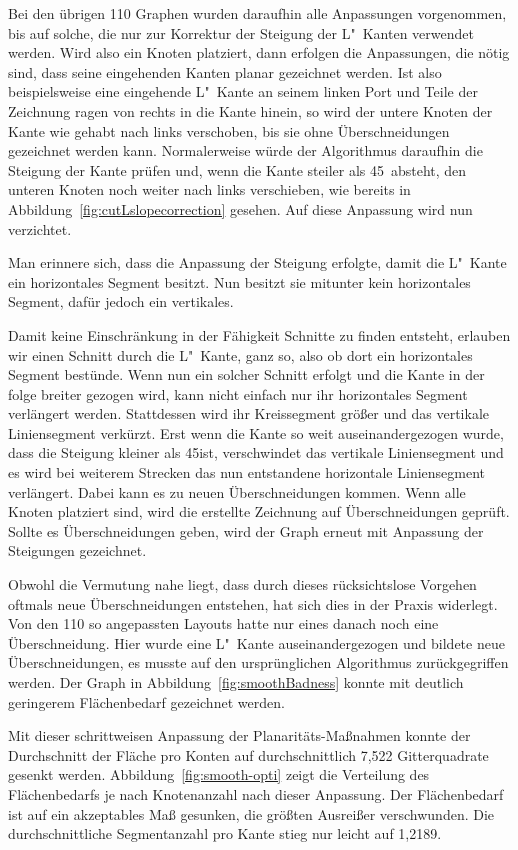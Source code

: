 \documentclass[a4paper]{scrreprt}
\theoremstyle{definition}
\begin{document}
Bei den übrigen 110 Graphen wurden daraufhin alle Anpassungen vorgenommen, bis auf solche, die nur zur Korrektur der Steigung der L"~Kanten verwendet werden. Wird also ein Knoten platziert, dann erfolgen die Anpassungen, die nötig sind, dass seine eingehenden Kanten planar gezeichnet werden. Ist also beispielsweise eine eingehende L"~Kante an seinem linken Port und Teile der Zeichnung ragen von rechts in die Kante hinein, so wird der untere Knoten der Kante wie gehabt nach links verschoben, bis sie ohne Überschneidungen gezeichnet werden kann. Normalerweise würde der Algorithmus daraufhin die Steigung der Kante prüfen und, wenn die Kante steiler als 45\textdegree\ absteht, den unteren Knoten noch weiter nach links verschieben, wie bereits in Abbildung~\ref{fig:cutLslopecorrection} gesehen. Auf diese Anpassung wird nun verzichtet. 

Man erinnere sich, dass die Anpassung der Steigung erfolgte, damit die L"~Kante ein horizontales Segment besitzt. Nun besitzt sie mitunter kein horizontales Segment, dafür jedoch ein vertikales.

Damit keine Einschränkung in der Fähigkeit Schnitte zu finden entsteht, erlauben wir einen Schnitt durch die L"~Kante, ganz so, also ob dort ein horizontales Segment bestünde. Wenn nun ein solcher Schnitt erfolgt und die Kante in der folge breiter gezogen wird, kann nicht einfach nur ihr horizontales Segment verlängert werden. Stattdessen wird ihr Kreissegment größer und das vertikale Liniensegment verkürzt. Erst wenn die Kante so weit auseinandergezogen wurde, dass die Steigung kleiner als 45\textdegree ist, verschwindet das vertikale Liniensegment und es wird bei weiterem Strecken das nun entstandene horizontale Liniensegment verlängert. Dabei kann es zu neuen Überschneidungen kommen. Wenn alle Knoten platziert sind, wird die erstellte Zeichnung auf Überschneidungen geprüft. Sollte es Überschneidungen geben, wird der Graph erneut mit Anpassung der Steigungen gezeichnet.

Obwohl die Vermutung nahe liegt, dass durch dieses rücksichtslose Vorgehen oftmals neue Überschneidungen entstehen, hat sich dies in der Praxis widerlegt. Von den 110 so angepassten Layouts hatte nur eines danach noch eine Überschneidung. Hier wurde eine L"~Kante auseinandergezogen und bildete neue Überschneidungen, es musste auf den ursprünglichen Algorithmus zurückgegriffen werden. Der Graph in Abbildung~\ref{fig:smoothBadness} konnte mit deutlich geringerem Flächenbedarf gezeichnet werden.

Mit dieser schrittweisen Anpassung der Planaritäts-Maßnahmen konnte der Durchschnitt der Fläche pro Konten auf durchschnittlich 7,522 Gitterquadrate gesenkt werden. Abbildung~\ref{fig:smooth-opti} zeigt die Verteilung des Flächenbedarfs je nach Knotenanzahl nach dieser Anpassung. Der Flächenbedarf ist auf ein akzeptables Maß gesunken, die größten Ausreißer verschwunden. Die durchschnittliche Segmentanzahl pro Kante stieg nur leicht auf 1,2189.
\end{document}
